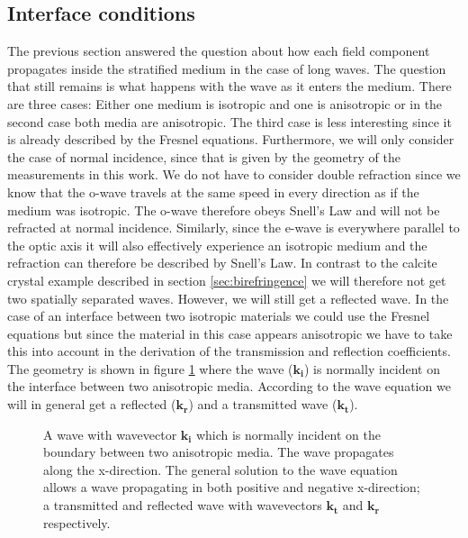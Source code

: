 \subsection{Interface conditions}
The previous section answered the question about how each field component propagates inside the stratified medium in the case of long waves. The question that still remains is what happens with the wave as it enters the medium. There are three cases: Either one medium is isotropic and one is anisotropic or in the second case both media are anisotropic. The third case is less interesting since it is already described by the Fresnel equations. Furthermore, we will only consider the case of normal incidence, since that is given by the geometry of the measurements in this work. We do not have to consider double refraction since we know that the o-wave travels at the same speed in every direction as if the medium was isotropic. The o-wave therefore obeys Snell's Law and will not be refracted at normal incidence. Similarly, since the e-wave is everywhere parallel to the optic axis it will also effectively experience an isotropic medium and the refraction can therefore be described by Snell's Law. In contrast to the calcite crystal example described in section \ref{sec:birefringence} we will therefore not get two spatially separated waves. However, we will still get a reflected wave. In the case of an interface between two isotropic materials we could use the Fresnel equations but since the material in this case appears anisotropic we have to take this into account in the derivation of the transmission and reflection coefficients. The geometry is shown in figure \ref{fig:interface_derivation} where the wave ($\bm{k_i}$) is normally incident on the interface between two anisotropic media. According to the wave equation we will in general get a reflected ($\bm{k_r}$) and a transmitted wave ($\bm{k_t}$). 

\begin{figure}[h]
    \centering
    
    \caption{A wave with wavevector $\bm{k_i}$ which is normally incident on the boundary between two anisotropic media. The wave propagates along the x-direction. The general solution to the wave equation allows a wave propagating in both positive and negative x-direction; a transmitted and reflected wave with wavevectors $\bm{k_t}$ and $\bm{k_r}$ respectively.}
    \label{fig:interface_derivation}
\end{figure}

